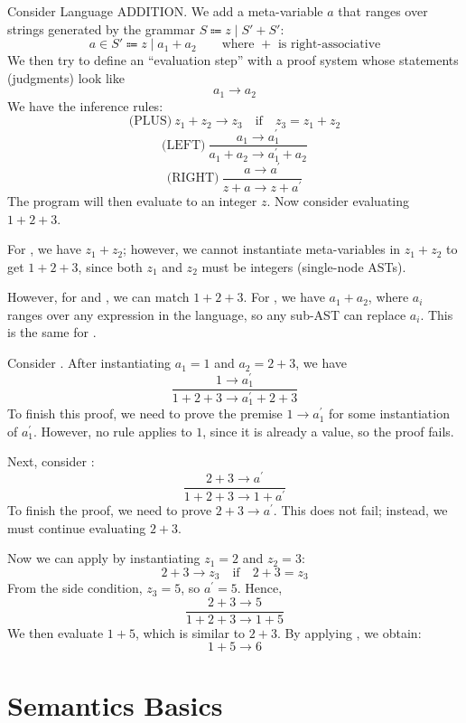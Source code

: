 \begin{eg}
Consider Language ADDITION. We add a meta-variable \(a\) that ranges over strings generated by the grammar \(S \Coloneqq z \mid S' + S'\): 
\[
  a \in S' \Coloneqq z \mid a_1 + a_2 \quad\quad \text{where } + \text{ is right-associative} 
\]
We then try to define an ``evaluation step'' with a proof system whose statements (judgments) look like
\[
  a_1 \to a_2
\]
We have the inference rules:
\[
  \text{(PLUS)}\ z_1 + z_2 \to z_3 \quad\text{if}\quad z_3 = z_1 + z_2
\]
\[
  \text{(LEFT)}\ \dfrac{a_1 \to a_1^{\prime}}{a_1 + a_2 \to a_1^{\prime} + a_2}
\]
\[
  \text{(RIGHT)}\ \dfrac{a \to a^{\prime}}{z + a \to z + a^{\prime}}
\]
The program will then evaluate to an integer \(z\). Now consider evaluating \(1 + 2 + 3\). 

For , we have \(z_1 + z_2\); however, we cannot instantiate meta-variables in \(z_1 + z_2\) to get \(1 + 2 + 3\), since both \(z_1\) and \(z_2\) must be integers (single-node ASTs). 

However, for  and , we can match \(1 + 2 + 3\). For , we have \(a_1 + a_2\), where \(a_i\) ranges over any expression in the language, so any sub-AST can replace \(a_i\). This is the same for . 

Consider . After instantiating \(a_1 = 1\) and \(a_2 = 2 + 3\), we have 
\[
  \dfrac{1 \to a_1^{\prime}}{1 + 2 + 3 \to a_1^{\prime} + 2 + 3}
\]
To finish this proof, we need to prove the premise \(1 \to a_1^{\prime}\) for some instantiation of \(a_1^{\prime}\). However, no rule applies to \(1\), since it is already a value, so the proof fails. 

Next, consider :
\[
  \dfrac{2 + 3 \to a^{\prime}}{1 + 2 + 3 \to 1 + a^{\prime}}
\]
To finish the proof, we need to prove \(2 + 3 \to a^{\prime}\). This does not fail; instead, we must continue evaluating \(2 + 3\). 

Now we can apply  by instantiating \(z_1 = 2\) and \(z_2 = 3\):
\[
  2 + 3 \to z_3 \quad\text{if}\quad 2 + 3 = z_3
\]
From the side condition, \(z_3 = 5\), so \(a^{\prime} = 5\). Hence,
\[
  \dfrac{2 + 3 \to 5}{1 + 2 + 3 \to 1 + 5}
\]
We then evaluate \(1 + 5\), which is similar to \(2 + 3\). By applying , we obtain:
\[
  1 + 5 \to 6
\]
\end{eg}

\chapter{Semantics Basics}

